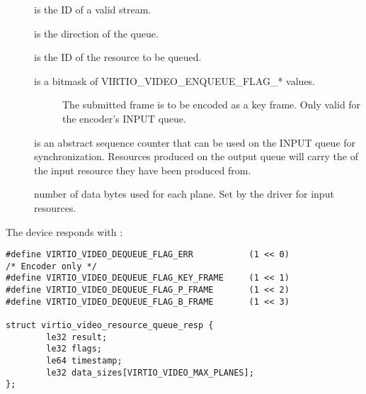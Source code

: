 \begin{description}
\item[]
is the ID of a valid stream.
\item[]
is the direction of the queue.
\item[]
is the ID of the resource to be queued.
\item[]
is a bitmask of VIRTIO\_VIDEO\_ENQUEUE\_FLAG\_* values.

\begin{description}
\item[]
The submitted frame is to be encoded as a key frame. Only valid for the
encoder's INPUT queue.
\end{description}
\item[]
is an abstract sequence counter that can be used on the INPUT queue for
synchronization. Resources produced on the output queue will carry the
 of the input resource they have been produced from.
\item[]
number of data bytes used for each plane. Set by the driver for input
resources.
\end{description}

The device responds with
:

\begin{lstlisting}
#define VIRTIO_VIDEO_DEQUEUE_FLAG_ERR           (1 << 0)
/* Encoder only */
#define VIRTIO_VIDEO_DEQUEUE_FLAG_KEY_FRAME     (1 << 1)
#define VIRTIO_VIDEO_DEQUEUE_FLAG_P_FRAME       (1 << 2)
#define VIRTIO_VIDEO_DEQUEUE_FLAG_B_FRAME       (1 << 3)

struct virtio_video_resource_queue_resp {
        le32 result;
        le32 flags;
        le64 timestamp;
        le32 data_sizes[VIRTIO_VIDEO_MAX_PLANES];
};
\end{lstlisting}

